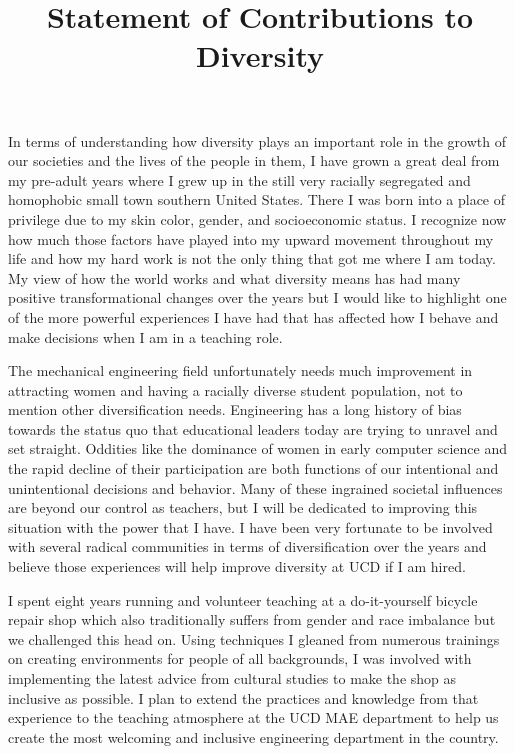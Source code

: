 \documentclass[titlepage]{article}
\title{Statement of Contributions to Diversity}
\date{}
\begin{document}
\maketitle

In terms of understanding how diversity plays an important role in the growth
of our societies and the lives of the people in them, I have grown a great deal
from my pre-adult years where I grew up in the still very racially segregated
and homophobic small town southern United States. There I was born into a place
of privilege due to my skin color, gender, and socioeconomic status. I
recognize now how much those factors have played into my upward movement
throughout my life and how my hard work is not the only thing that got me where
I am today. My view of how the world works and what diversity means has had
many positive transformational changes over the years but I would like to
highlight one of the more powerful experiences I have had that has affected how
I behave and make decisions when I am in a teaching role.

The mechanical engineering field unfortunately needs much improvement in
attracting women and having a racially diverse student population, not to
mention other diversification needs. Engineering has a long history of bias
towards the status quo that educational leaders today are trying to unravel and
set straight. Oddities like the dominance of women in early computer science
and the rapid decline of their participation are both functions of our
intentional and unintentional decisions and behavior. Many of these ingrained
societal influences are beyond our control as teachers, but I will be dedicated
to improving this situation with the power that I have. I have been very
fortunate to be involved with several radical communities in terms of
diversification over the years and believe those experiences will help improve
diversity at UCD if I am hired.

I spent eight years running and volunteer teaching at a do-it-yourself bicycle
repair shop which also traditionally suffers from gender and race imbalance but
we challenged this head on. Using techniques I gleaned from numerous trainings
on creating environments for people of all backgrounds, I was involved with
implementing the latest advice from cultural studies to make the shop as
inclusive as possible. I plan to extend the practices and knowledge from that
experience to the teaching atmosphere at the UCD MAE department to help us
create the most welcoming and inclusive engineering department in the country.
\end{document}
